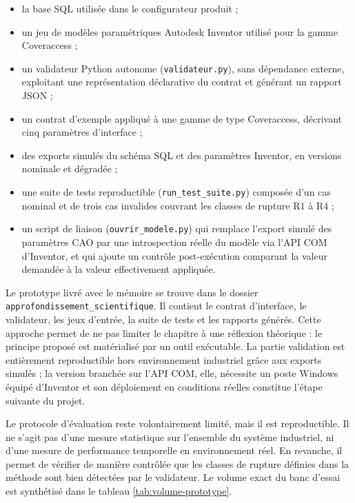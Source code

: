 \begin{itemize}[leftmargin=1.4cm]
\item la base SQL utilisée dans le configurateur produit ;
\item un jeu de modèles paramétriques Autodesk Inventor utilisé pour la gamme Coveraccess ;
\item un validateur Python autonome (\texttt{validateur.py}), sans dépendance externe, exploitant une représentation déclarative du contrat et générant un rapport JSON ;
\item un contrat d'exemple appliqué à une gamme de type Coveraccess, décrivant cinq paramètres d'interface ;
\item des exports simulés du schéma SQL et des paramètres Inventor, en versions nominale et dégradée ;
\item une suite de tests reproductible (\texttt{run\_test\_suite.py}) composée d'un cas nominal et de trois cas invalides couvrant les classes de rupture R1 à R4 ;
\item un script de liaison (\texttt{ouvrir\_modele.py}) qui remplace l'export simulé des paramètres CAO par une introspection réelle du modèle via l'API COM d'Inventor, et qui ajoute un contrôle post-exécution comparant la valeur demandée à la valeur effectivement appliquée.
\end{itemize}

Le prototype livré avec le mémoire se trouve dans le dossier \texttt{approfondissement\_scientifique}. Il contient le contrat d'interface, le validateur, les jeux d'entrée, la suite de tests et les rapports générés. Cette approche permet de ne pas limiter le chapitre à une réflexion théorique : le principe proposé est matérialisé par un outil exécutable. La partie validation est entièrement reproductible hors environnement industriel grâce aux exports simulés ; la version branchée sur l'API COM, elle, nécessite un poste Windows équipé d'Inventor et son déploiement en conditions réelles constitue l'étape suivante du projet.

Le protocole d'évaluation reste volontairement limité, mais il est reproductible. Il ne s'agit pas d'une mesure statistique sur l'ensemble du système industriel, ni d'une mesure de performance temporelle en environnement réel. En revanche, il permet de vérifier de manière contrôlée que les classes de rupture définies dans la méthode sont bien détectées par le validateur. Le volume exact du banc d'essai est synthétisé dans le tableau \ref{tab:volume-prototype}.

